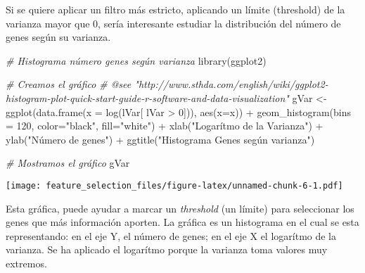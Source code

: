 \documentclass[
]{article}
\newenvironment{Shaded}{\begin{snugshade}}{\end{snugshade}}
\newcommand{\AttributeTok}[1]{\textcolor[rgb]{0.77,0.63,0.00}{#1}}
\newcommand{\CommentTok}[1]{\textcolor[rgb]{0.56,0.35,0.01}{\textit{#1}}}
\newcommand{\DecValTok}[1]{\textcolor[rgb]{0.00,0.00,0.81}{#1}}
\newcommand{\FunctionTok}[1]{\textcolor[rgb]{0.00,0.00,0.00}{#1}}
\newcommand{\NormalTok}[1]{#1}
\newcommand{\OtherTok}[1]{\textcolor[rgb]{0.56,0.35,0.01}{#1}}
\newcommand{\SpecialCharTok}[1]{\textcolor[rgb]{0.00,0.00,0.00}{#1}}
\newcommand{\StringTok}[1]{\textcolor[rgb]{0.31,0.60,0.02}{#1}}
\begin{document}
Si se quiere aplicar un filtro más estricto, aplicando un límite
(threshold) de la varianza mayor que 0, sería interesante estudiar la
distribución del número de genes según su varianza.

\begin{Shaded}
\begin{Highlighting}[]
\CommentTok{\# Histograma número genes según varianza}
\FunctionTok{library}\NormalTok{(ggplot2)}

\CommentTok{\# Creamos el gráfico}
\CommentTok{\# @see "http://www.sthda.com/english/wiki/ggplot2{-}histogram{-}plot{-}quick{-}start{-}guide{-}r{-}software{-}and{-}data{-}visualization"}
\NormalTok{gVar }\OtherTok{\textless{}{-}} \FunctionTok{ggplot}\NormalTok{(}\FunctionTok{data.frame}\NormalTok{(}\AttributeTok{x =} \FunctionTok{log}\NormalTok{(lVar[ lVar }\SpecialCharTok{\textgreater{}} \DecValTok{0}\NormalTok{])), }\FunctionTok{aes}\NormalTok{(}\AttributeTok{x=}\NormalTok{x)) }\SpecialCharTok{+} 
  \FunctionTok{geom\_histogram}\NormalTok{(}\AttributeTok{bins =} \DecValTok{120}\NormalTok{, }\AttributeTok{color=}\StringTok{"black"}\NormalTok{, }\AttributeTok{fill=}\StringTok{"white"}\NormalTok{) }\SpecialCharTok{+}
  \FunctionTok{xlab}\NormalTok{(}\StringTok{"Logarítmo de la Varianza"}\NormalTok{) }\SpecialCharTok{+} 
  \FunctionTok{ylab}\NormalTok{(}\StringTok{"Número de genes"}\NormalTok{) }\SpecialCharTok{+}
  \FunctionTok{ggtitle}\NormalTok{(}\StringTok{"Histograma Genes según varianza"}\NormalTok{)}

\CommentTok{\# Mostramos el gráfico}
\NormalTok{gVar}
\end{Highlighting}
\end{Shaded}

\texttt{[image: feature\_selection\_files/figure-latex/unnamed-chunk-6-1.pdf]}

Esta gráfica, puede ayudar a marcar un \emph{threshold} (un límite) para
seleccionar los genes que más información aporten. La gráfica es un
histograma en el cual se esta representando: en el eje Y, el número de
genes; en el eje X el logarítmo de la varianza. Se ha aplicado el
logarítmo porque la varianza toma valores muy extremos.
\end{document}
